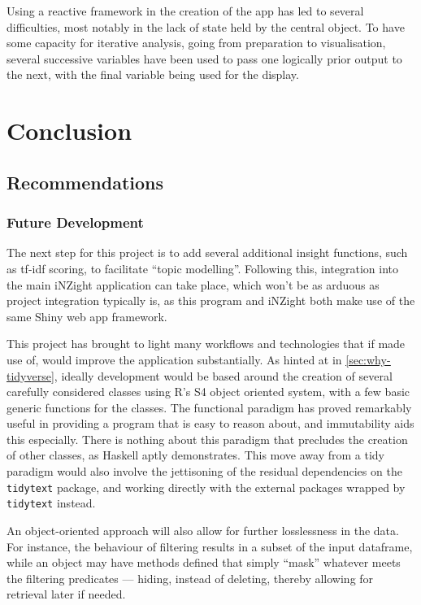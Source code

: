 \documentclass[11pt, a4paper, titlepage]{report}
\begin{document}
Using a reactive framework in the creation of the app has led to
several difficulties, most notably in the lack of state held by the
central object. To have some capacity for iterative analysis, going
from preparation to visualisation, several successive variables have
been used to pass one logically prior output to the next, with the
final variable being used for the display.

\chapter{Conclusion}\label{cha:conclusion}

\section{Recommendations}\label{sec:recommendations}

\subsection{Future Development}

The next step for this project is to add several additional insight
functions, such as tf-idf scoring, to facilitate ``topic modelling''.
Following this, integration into the main iNZight application can take
place, which won't be as arduous as project integration typically is,
as this program and iNZight both make use of the same Shiny web app
framework.

This project has brought to light many workflows and technologies that
if made use of, would improve the application substantially. As hinted
at in \underline{\cref{sec:why-tidyverse}}, ideally
development would be based around the creation of several carefully
considered classes using R's S4 object oriented system, with a few
basic generic functions for the classes. The functional paradigm has
proved remarkably useful in providing a program that is easy to reason
about, and immutability aids this especially. There is nothing about
this paradigm that precludes the creation of other classes, as Haskell
aptly demonstrates\autocite{Hudak07ahistory}. This move away from a
tidy paradigm would also involve the jettisoning of the residual
dependencies on the \texttt{tidytext} package, and working directly with the
external packages wrapped by \texttt{tidytext} instead.

An object-oriented approach will also allow for further losslessness
in the data. For instance, the behaviour of filtering results in a
subset of the input dataframe, while an object may have methods
defined that simply ``mask'' whatever meets the filtering predicates
--- hiding, instead of deleting, thereby allowing for retrieval later
if needed.
\end{document}
